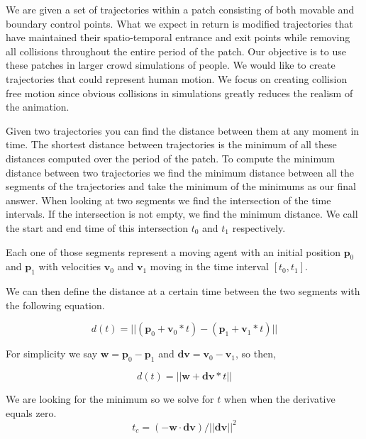 
We are given a set of trajectories within a patch consisting of both movable and boundary control points. What we expect in return is modified trajectories that have maintained their spatio-temporal entrance and exit points while removing all collisions throughout the entire period of the patch. Our objective is to use these patches in larger crowd simulations of people. We would like to create trajectories that could represent human motion. We focus on creating collision free motion since obvious collisions in simulations greatly reduces the realism of the animation.





Given two trajectories you can find the distance between them at any moment in time. The shortest distance between trajectories is the minimum of all these distances computed over the period of the patch. To compute the minimum distance between two trajectories we find the minimum distance between all the segments of the trajectories and take the minimum of the minimums as our final answer. When looking at two segments we find the intersection of the time intervals. If the intersection is not empty, we find the minimum distance. We call the start and end time of this intersection $t_0$ and $t_1$ respectively.

Each one of those segments represent a moving agent with an initial position $\mathbf{p}_0$ and $\mathbf{p}_1$ with velocities $\mathbf{v}_0$ and $\mathbf{v}_1$ moving in the time interval $[t_0,t_1]$. 

We can then define the distance at a certain time between the two segments with the following equation.

\begin{equation}
	d(t) = || (\mathbf{p}_0+\mathbf{v}_0*t) - (\mathbf{p}_1+\mathbf{v}_1*t) ||
	\label{eqn:distance}
\end{equation}

For simplicity we say $ \mathbf{w} = \mathbf{p}_0-\mathbf{p}_1$ and $\mathbf{dv} = \mathbf{v}_0-\mathbf{v}_1$, so then,

\begin{equation}
	d(t) = || \mathbf{w} + \mathbf{dv}*t ||
	\label{eqn:distance_simple}
\end{equation}



We are looking for the minimum so we solve for $t$ when when the derivative equals zero.
\begin{equation}
	t_c = (-\mathbf{w} \cdot \mathbf{dv}) / || \mathbf{dv} ||^2
\end{equation}

